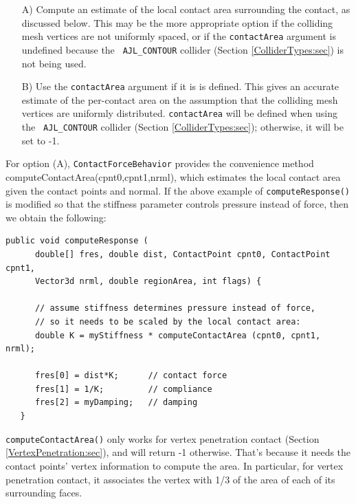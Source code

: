 \begin{enumerate}

\item[A)] Compute an estimate of the local contact area surrounding
the contact, as discussed below. This may be the more appropriate
option if the colliding mesh vertices are not uniformly spaced, or if
the {\tt contactArea} argument is undefined because the {\tt
AJL\_CONTOUR} collider (Section \ref{ColliderTypes:sec}) is not being
used.

\item[B)] Use the {\tt contactArea} argument if it is
is defined. This gives an accurate estimate of the per-contact area on
the assumption that the colliding mesh vertices are uniformly
distributed. {\tt contactArea} will be defined when using the {\tt
AJL\_CONTOUR} collider (Section \ref{ColliderTypes:sec}); otherwise,
it will be set to -1.

\end{enumerate}

For option (A), {\tt ContactForceBehavior} provides the convenience
method
%
{computeContactArea(cpnt0,cpnt1,nrml)}, which estimates the local
contact area given the contact points and normal. If the above example
of {\tt computeResponse()} is modified so that the stiffness parameter
controls pressure instead of force, then we obtain the following:
%
\begin{lstlisting}[]
   public void computeResponse (
      double[] fres, double dist, ContactPoint cpnt0, ContactPoint cpnt1, 
      Vector3d nrml, double regionArea, int flags) {

      // assume stiffness determines pressure instead of force,
      // so it needs to be scaled by the local contact area:
      double K = myStiffness * computeContactArea (cpnt0, cpnt1, nrml);

      fres[0] = dist*K;      // contact force
      fres[1] = 1/K;         // compliance
      fres[2] = myDamping;   // damping
   }
\end{lstlisting}
%

\begin{sideblock}
{\tt computeContactArea()} only works for vertex penetration
contact (Section \ref{VertexPenetration:sec}), and will return -1
otherwise. That's because it needs the contact points' vertex
information to compute the area.  In particular, for vertex penetration 
contact, it associates the vertex with 1/3 of the area of
each of its surrounding faces.
\end{sideblock}

